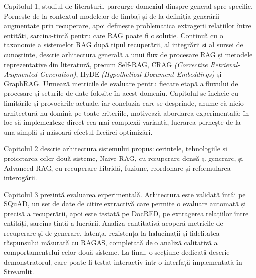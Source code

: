 Capitolul 1, studiul de literatură, parcurge domeniul dinspre general spre specific. Pornește de la contextul modelelor de limbaj și de la definiția generării augmentate prin recuperare, apoi definește problematica extragerii relațiilor între entități, sarcina-țintă pentru care RAG poate fi o soluție. Continuă cu o taxonomie a sistemelor RAG după tipul recuperării, al integrării și al sursei de cunoștințe, descrie arhitectura generală a unui flux de procesare RAG și metodele reprezentative din literatură, precum Self-RAG, CRAG \textit{(Corrective Retrieval-Augmented Generation)}, HyDE \textit{(Hypothetical Document Embeddings)} și GraphRAG. Urmează metricile de evaluare pentru fiecare etapă a fluxului de procesare și seturile de date folosite în acest domeniu. Capitolul se încheie cu limitările și provocările actuale, iar concluzia care se desprinde, anume că nicio arhitectură nu domină pe toate criteriile, motivează abordarea experimentală: în loc să implementeze direct cea mai complexă variantă, lucrarea pornește de la una simplă și măsoară efectul fiecărei optimizări.

Capitolul 2 descrie arhitectura sistemului propus: cerințele, tehnologiile și proiectarea celor două sisteme, Naive RAG, cu recuperare densă și generare, și Advanced RAG, cu recuperare hibridă, fuziune, reordonare și reformularea interogării.

Capitolul 3 prezintă evaluarea experimentală. Arhitectura este validată întâi pe SQuAD, un set de date de citire extractivă care permite o evaluare automată și precisă a recuperării, apoi este testată pe DocRED, pe extragerea relațiilor între entități, sarcina-țintă a lucrării. Analiza cantitativă acoperă metricile de recuperare și de generare, latența, rezistența la halucinații și fidelitatea răspunsului măsurată cu RAGAS, completată de o analiză calitativă a comportamentului celor două sisteme. La final, o secțiune dedicată descrie demonstratorul, care poate fi testat interactiv într-o interfață implementată în Streamlit.

